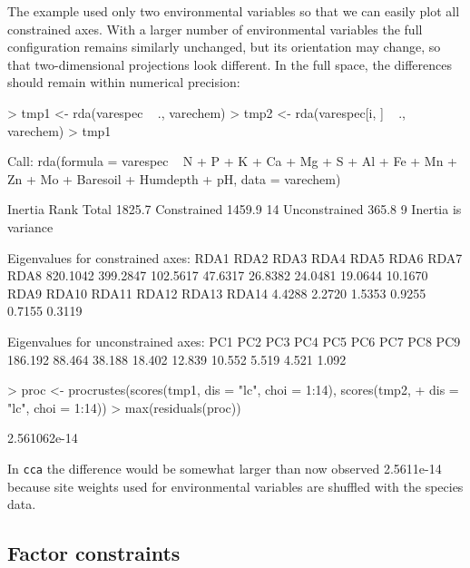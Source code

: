 \documentclass[a4paper,10pt]{amsart}
\begin{document}
The example used only two environmental variables so that we can
easily plot all constrained axes.  With a larger number of
environmental variables the full configuration remains similarly
unchanged, but its orientation may change, so that two-dimensional
projections look different.  In the full space, the differences should
remain within numerical precision:
\begin{Schunk}
\begin{Sinput}
> tmp1 <- rda(varespec ~ ., varechem)
> tmp2 <- rda(varespec[i, ] ~ ., varechem)
> tmp1
\end{Sinput}
\begin{Soutput}
Call:
rda(formula = varespec ~ N + P + K + Ca + Mg + S + Al + Fe +      Mn + Zn + Mo + Baresoil + Humdepth + pH, data = varechem) 

              Inertia Rank
Total          1825.7     
Constrained    1459.9   14
Unconstrained   365.8    9
Inertia is variance 

Eigenvalues for constrained axes:
    RDA1     RDA2     RDA3     RDA4     RDA5     RDA6     RDA7     RDA8 
820.1042 399.2847 102.5617  47.6317  26.8382  24.0481  19.0644  10.1670 
    RDA9    RDA10    RDA11    RDA12    RDA13    RDA14 
  4.4288   2.2720   1.5353   0.9255   0.7155   0.3119 

Eigenvalues for unconstrained axes:
    PC1     PC2     PC3     PC4     PC5     PC6     PC7     PC8     PC9 
186.192  88.464  38.188  18.402  12.839  10.552   5.519   4.521   1.092 
\end{Soutput}
\begin{Sinput}
> proc <- procrustes(scores(tmp1, dis = "lc", choi = 1:14), scores(tmp2, 
+     dis = "lc", choi = 1:14))
> max(residuals(proc))
\end{Sinput}
\begin{Soutput}
[1] 2.561062e-14
\end{Soutput}
\end{Schunk}
In \texttt{cca} the difference would be somewhat larger than now
observed 2.5611e-14 because site
weights used for environmental variables are shuffled with the species
data.

\subsection{Factor constraints}
\end{document}
